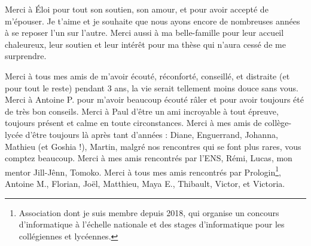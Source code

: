 Merci à Éloi pour tout son soutien, son amour, et pour avoir accepté de m’épouser. Je t’aime et je souhaite que nous ayons encore de nombreuses années à se reposer l’un sur l’autre. Merci aussi à ma belle-famille pour leur accueil chaleureux, leur soutien et leur intérêt pour ma thèse qui n’aura cessé de me surprendre.


Merci à tous mes amis de m’avoir écouté, réconforté, conseillé, et distraite (et pour tout le reste) pendant 3 ans, la vie serait tellement moins douce sans vous.
Merci à Antoine P. pour m’avoir beaucoup écouté râler et pour avoir toujours été de très bon conseils. Merci à Paul d’être un ami incroyable à tout épreuve, toujours présent et calme en toute circonstances. Merci à mes amis de collège-lycée d’être toujours là après tant d’années : Diane, Enguerrand, Johanna, Mathieu (et Goshia !), Martin, malgré nos rencontres qui se font plus rares, vous comptez beaucoup. Merci à mes amis rencontrés par l’ENS, Rémi, Lucas, mon mentor Jill-Jênn, Tomoko. Merci à tous mes amis rencontrés par Prologin\footnote{Association dont je suis membre depuis 2018, qui organise un concours d’informatique à l’échelle nationale et des stages d’informatique pour les collégiennes et lycéennes.}, Antoine M., Florian, Joël, Matthieu, Maya E., Thibault, Victor, et Victoria.
